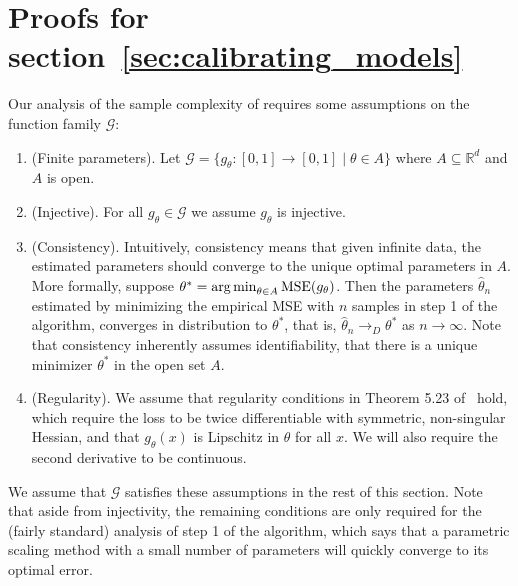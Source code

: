 \newpage
\section{Proofs for section~\ref{sec:calibrating_models}}
\label{sec:calibrating_models_appendix}

\newcommand{\G}[0]{\ensuremath{\mathcal{G}}}

Our analysis of the sample complexity of \ourcal{} requires some assumptions on the function family $\G{}$:

\begin{enumerate}
  \item (Finite parameters). Let $\G{} = \{ g_{\theta} : [0, 1] \to [0, 1] \; | \; \theta \in A \}$ where $A \subseteq \mathbb{R}^{d}$ and $A$ is open.
\item (Injective). For all $g_{\theta} \in \G{}$ we assume $g_{\theta}$ is injective.
\item (Consistency). Intuitively, consistency means that given infinite data, the estimated parameters should converge to the unique optimal parameters in $A$.
More formally, suppose $\theta^* = \operatorname*{arg\,min}_{\theta \in A} \textup{MSE}(g_{\theta})$.
Then the parameters $\hat{\theta}_n$ estimated by minimizing the empirical MSE with $n$ samples in step 1 of the algorithm, converges in distribution to $\theta^*$, that is, $\hat{\theta}_n \to_D \theta^*$ as $n \to \infty$. Note that consistency inherently assumes identifiability, that there is a unique minimizer $\theta^*$ in the open set $A$.
\item (Regularity). We assume that regularity conditions in Theorem 5.23 of~\cite{vaart98asymptotic} hold, which require the loss to be twice differentiable with symmetric, non-singular Hessian, and that $g_{\theta}(x)$ is Lipschitz in $\theta$ for all $x$. We will also require the second derivative to be continuous.
\end{enumerate}

We assume that $\G{}$ satisfies these assumptions in the rest of this section. Note that aside from injectivity, the remaining conditions are only required for the (fairly standard) analysis of step 1 of the algorithm, which says that a parametric scaling method with a small number of parameters will quickly converge to its optimal error.


